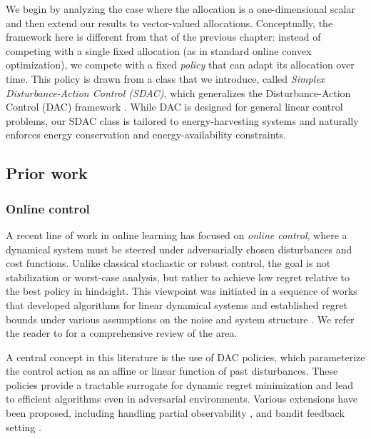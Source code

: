 We begin by analyzing the case where the allocation is a one-dimensional scalar and then extend our results to vector-valued allocations. Conceptually, the framework here is different from that of the previous chapter: instead of competing with a single fixed allocation (as in standard online convex optimization), we compete with a fixed \emph{policy} that can adapt its allocation over time. This policy is drawn from a class that we introduce, called \emph{Simplex Disturbance-Action Control (SDAC)}, which generalizes the Disturbance-Action Control (DAC) framework \cite{hazan_introduction_2025}. While DAC is designed for general linear control problems, our SDAC class is tailored to energy-harvesting systems and naturally enforces energy conservation and energy-availability constraints.



\subsection{Prior work}
\subsubsection{Online control}

A recent line of work in online learning has focused on \emph{online control}, where a dynamical system must be steered under adversarially chosen disturbances and cost functions. Unlike classical stochastic or robust control, the goal is not stabilization or worst-case analysis, but rather to achieve low regret relative to the best policy in hindsight. This viewpoint was initiated in a sequence of works that developed algorithms for linear dynamical systems and established regret bounds under various assumptions on the noise and system structure \cite{agarwal2019online, agarwal2019logarithmic, hazan2020nonstochasticBandit, simchowitz2020improper}. We refer the reader to \cite{hazan_introduction_2025} for a comprehensive review of the area.

A central concept in this literature is the use of DAC policies, which parameterize the control action as an affine or linear function of past disturbances. These policies provide a tractable surrogate for dynamic regret minimization and lead to efficient algorithms even in adversarial environments. Various extensions have been proposed, including handling partial observability \cite{lale2020logarithmic}, and bandit feedback setting \cite{hazan2020nonstochasticBandit}.

